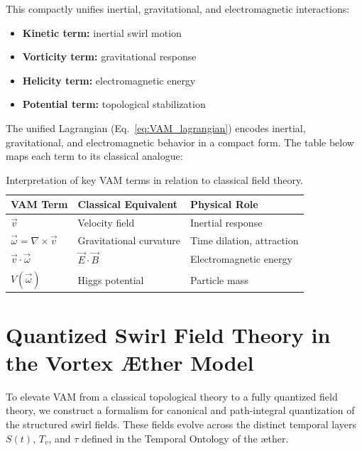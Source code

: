\documentclass[preprint]{revtex4-2}
\begin{document}
        This compactly unifies inertial, gravitational, and electromagnetic interactions:
         \begin{itemize}
        \item \textbf{Kinetic term:} inertial swirl motion
        \item \textbf{Vorticity term:} gravitational response
        \item \textbf{Helicity term:} electromagnetic energy
        \item \textbf{Potential term:} topological stabilization
        \end{itemize}

    The unified Lagrangian (Eq.~\ref{eq:VAM_lagrangian}) encodes inertial, gravitational, and electromagnetic behavior in a compact form. The table below maps each term to its classical analogue:

    \begin{table}[H]
        \centering
        \renewcommand{\arraystretch}{1.3}
        \begin{tabular}{|l|l|l|}
            \hline
            \textbf{VAM Term} & \textbf{Classical Equivalent} & \textbf{Physical Role} \\
            \hline
            \( \vec{v} \) & Velocity field & Inertial response \\
            \( \vec{\omega} = \nabla \times \vec{v} \) & Gravitational curvature & Time dilation, attraction \\
            \( \vec{v} \cdot \vec{\omega} \) & \( \vec{E} \cdot \vec{B} \) & Electromagnetic energy \\
            \( V(\vec{\omega}) \) & Higgs potential & Particle mass \\
            \hline
        \end{tabular}
        \caption{Interpretation of key VAM terms in relation to classical field theory.}
        \label{tab:vam_classical_mapping}
    \end{table}


\section{Quantized Swirl Field Theory in the Vortex \AE{}ther Model}\label{sec:quantized_swirl_field_theory}
    To elevate VAM from a classical topological theory to a fully quantized field theory, we construct a formalism for canonical and path-integral quantization of the structured swirl fields. These fields evolve across the distinct temporal layers \( S(t) \), \( T_v \), and \( \tau \) defined in the Temporal Ontology of the æther.
\end{document}
